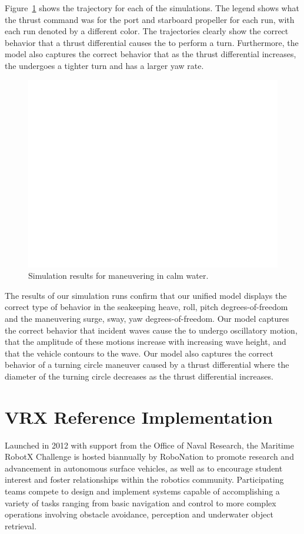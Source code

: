 \documentclass[utf8]{frontiersSCNS} %
\begin{document}
Figure~\ref{f:manuevering} shows the \wamv{} trajectory for each of the simulations. The legend shows what the thrust command was for the port and starboard propeller for each run, with each run denoted by a different color. The trajectories clearly show the correct behavior that a thrust differential causes the \wamv{} to perform a turn. Furthermore, the model also captures the correct behavior that as the thrust differential increases, the \wamv{} undergoes a tighter turn and has a larger yaw rate.
\begin{figure}[h]
  \centering
  \includegraphics[width=\SFc\textwidth]{src/2020_08_25_manuevering_000.png}
  \caption{Simulation results for maneuvering in calm water.}
  \label{f:manuevering}
\end{figure}

The results of our simulation runs confirm that our unified model displays the correct type of behavior in the seakeeping heave, roll, pitch degrees-of-freedom and the maneuvering surge, sway, yaw degrees-of-freedom. Our model captures the correct behavior that incident waves cause the \wamv{} to undergo oscillatory motion, that the amplitude of these motions increase with increasing wave height, and that the vehicle contours to the wave. Our model also captures the correct behavior of a turning circle maneuver caused by a thrust differential where the diameter of the turning circle decreases as the thrust differential increases.
%
\section{VRX Reference Implementation}
%
Launched in 2012 with support from the Office of Naval Research, the Maritime RobotX Challenge is hosted biannually by RoboNation to promote research and advancement in autonomous surface vehicles, as well as to encourage student interest and foster relationships within the robotics community. Participating teams compete to design and implement systems capable of accomplishing a variety of tasks ranging from basic navigation and control to more complex operations involving obstacle avoidance, perception and underwater object retrieval.
\end{document}
